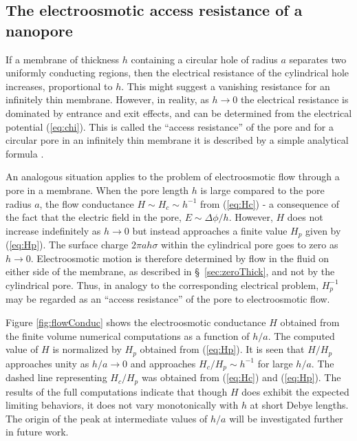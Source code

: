\subsection{The electroosmotic access resistance of a nanopore}
If a membrane of thickness $h$ containing a circular hole of radius $a$ separates two uniformly conducting regions, then the electrical resistance of the cylindrical hole increases,
proportional to $h$. This might suggest a vanishing resistance for an infinitely thin membrane. However, in reality, as $h\rightarrow 0$ the electrical resistance is dominated by entrance and exit effects,
and can be determined from the electrical potential (\ref{eq:chi}). This is called the ``access resistance'' of the pore and for a circular pore in an infinitely thin membrane it is described by a simple analytical formula \cite{Hall1975}.

An analogous situation applies to the problem of electroosmotic flow through a pore in a membrane. When the pore length $h$ is large compared to the pore radius $a$, the flow conductance $H \sim H_c \sim h^{-1}$ from (\ref{eq:Hc}) - a consequence of the fact that the electric field in the pore, $E \sim \Delta \phi / h$. However, $H$ does not increase indefinitely as $h \rightarrow 0$ but instead approaches a finite value $H_p$ given by (\ref{eq:Hp}). The surface charge $2\pi ah\sigma$ within the cylindrical pore goes to zero as $h\rightarrow 0$. Electroosmotic motion is therefore determined by
flow in the fluid on either side of the membrane, as described in \S~\ref{sec:zeroThick}, and not by the cylindrical pore. Thus, in analogy to the corresponding electrical problem, $H_p^{-1}$ may be regarded as an  ``access resistance'' of the pore to electroosmotic flow.

Figure \ref{fig:flowConduc} shows the electroosmotic conductance $H$ obtained from 
the finite volume numerical computations as a function of  $h/a$. The computed value of $H$ is normalized by $H_p$ obtained from (\ref{eq:Hp}). It is seen that $H/H_p$ approaches unity as $h/a \rightarrow 0$ and approaches $H_c/H_p \sim h^{-1}$ for large $h/a$. The dashed line representing $H_c/H_p$ was obtained from (\ref{eq:Hc}) and (\ref{eq:Hp}). The results of the full computations indicate that though $H$ does exhibit the expected limiting behaviors, it does not vary monotonically with $h$ at short Debye lengths. The origin of the peak at intermediate values of $h/a$ will be investigated further in future work.


